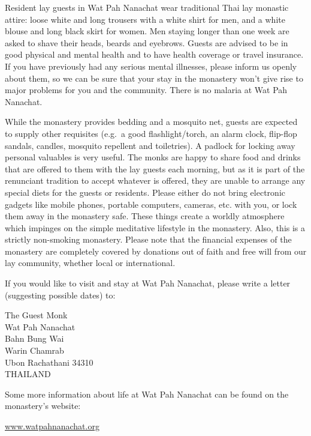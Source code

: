 Resident lay guests in Wat Pah Nanachat wear traditional Thai lay
monastic attire: loose white and long trousers with a white shirt for
men, and a white blouse and long black skirt for women. Men staying
longer than one week are asked to shave their heads, beards and
eyebrows. Guests are advised to be in good physical and mental health
and to have health coverage or travel insurance. If you have previously
had any serious mental illnesses, please inform us openly about them, so
we can be sure that your stay in the monastery won't give rise to major
problems for you and the community. There is no malaria at Wat Pah
Nanachat.

While the monastery provides bedding and a mosquito net, guests are
expected to supply other requisites (e.g.~a good flashlight/torch, an
alarm clock, flip-flop sandals, candles, mosquito repellent and
toiletries). A padlock for locking away personal valuables is very
useful. The monks are happy to share food and drinks that are offered to
them with the lay guests each morning, but as it is part of the
renunciant tradition to accept whatever is offered, they are unable to
arrange any special diets for the guests or residents. Please either do
not bring electronic gadgets like mobile phones, portable computers,
cameras, etc. with you, or lock them away in the monastery safe. These
things create a worldly atmosphere which impinges on the simple
meditative lifestyle in the monastery. Also, this is a strictly
non-smoking monastery. Please note that the financial expenses of the
monastery are completely covered by donations out of faith and free will
from our lay community, whether local or international.

\clearpage

If you would like to visit and stay at Wat Pah Nanachat, please write a
letter (suggesting possible dates) to:

The Guest Monk\\
Wat Pah Nanachat\\
Bahn Bung Wai\\
Warin Chamrab\\
Ubon Rachathani 34310\\
THAILAND

Some more information about life at Wat Pah Nanachat can be found on the
monastery's website:

\href{http://www.watpahnanachat.org/}{www.watpahnanachat.org}

